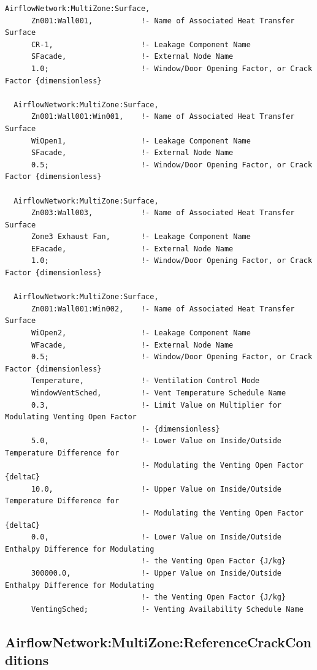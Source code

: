 \begin{lstlisting}
AirflowNetwork:MultiZone:Surface,
      Zn001:Wall001,           !- Name of Associated Heat Transfer Surface
      CR-1,                    !- Leakage Component Name
      SFacade,                 !- External Node Name
      1.0;                     !- Window/Door Opening Factor, or Crack Factor {dimensionless}

  AirflowNetwork:MultiZone:Surface,
      Zn001:Wall001:Win001,    !- Name of Associated Heat Transfer Surface
      WiOpen1,                 !- Leakage Component Name
      SFacade,                 !- External Node Name
      0.5;                     !- Window/Door Opening Factor, or Crack Factor {dimensionless}

  AirflowNetwork:MultiZone:Surface,
      Zn003:Wall003,           !- Name of Associated Heat Transfer Surface
      Zone3 Exhaust Fan,       !- Leakage Component Name
      EFacade,                 !- External Node Name
      1.0;                     !- Window/Door Opening Factor, or Crack Factor {dimensionless}

  AirflowNetwork:MultiZone:Surface,
      Zn001:Wall001:Win002,    !- Name of Associated Heat Transfer Surface
      WiOpen2,                 !- Leakage Component Name
      WFacade,                 !- External Node Name
      0.5;                     !- Window/Door Opening Factor, or Crack Factor {dimensionless}
      Temperature,             !- Ventilation Control Mode
      WindowVentSched,         !- Vent Temperature Schedule Name
      0.3,                     !- Limit Value on Multiplier for Modulating Venting Open Factor
                               !- {dimensionless}
      5.0,                     !- Lower Value on Inside/Outside Temperature Difference for
                               !- Modulating the Venting Open Factor {deltaC}
      10.0,                    !- Upper Value on Inside/Outside Temperature Difference for
                               !- Modulating the Venting Open Factor {deltaC}
      0.0,                     !- Lower Value on Inside/Outside Enthalpy Difference for Modulating
                               !- the Venting Open Factor {J/kg}
      300000.0,                !- Upper Value on Inside/Outside Enthalpy Difference for Modulating
                               !- the Venting Open Factor {J/kg}
      VentingSched;            !- Venting Availability Schedule Name
\end{lstlisting}

\subsection{AirflowNetwork:MultiZone:ReferenceCrackConditions}\label{airflownetworkmultizonereferencecrackconditions}

